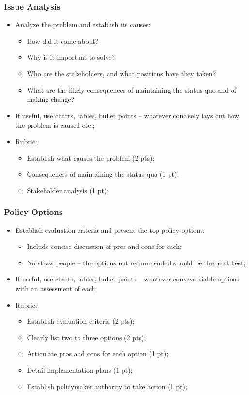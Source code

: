\documentclass[aspectratio=169]{beamer}
\theoremstyle{principle}
\begin{document}
\begin{frame}
\frametitle{Issue Analysis}

\begin{itemize}

\item Analyze the problem and establish its causes:
\begin{itemize} 
\item How did it come about? 
\item Why is it important to solve? 
\item Who are the stakeholders, and what positions have they taken?  
\item What are the likely consequences of maintaining the status quo and of making change?
\end{itemize}
\bigskip
\bigskip
\item If useful, use charts, tables, bullet points – whatever concisely lays out how the problem is caused etc.;
\bigskip
\bigskip
\item Rubric:
\begin{itemize}
\item Establish what causes the problem (2 pts);
\item Consequences of maintaining the status quo (1 pt);
\item Stakeholder analysis (1 pt);
\end{itemize}
\end{itemize}

\end{frame}

\begin{frame}
\frametitle{Policy Options}

\begin{itemize}

\item Establish evaluation criteria and present the top policy options:
\begin{itemize} 
\item Include concise discussion of pros and cons for each; 
\item No straw people -- the options not recommended should be the next best;
\end{itemize}
\bigskip
\bigskip
\item If useful, use charts, tables, bullet points – whatever conveys viable options with an assessment of each;
\bigskip
\bigskip
\item Rubric:
\begin{itemize}
\item Establish evaluation criteria (2 pts);
\item Clearly list two to three options (2 pts);
\item Articulate pros and cons for each option (1 pt);
\item Detail implementation plans (1 pt);
\item Establish policymaker authority to take action (1 pt);
\end{itemize}
\end{itemize}

\end{frame}
\end{document}

